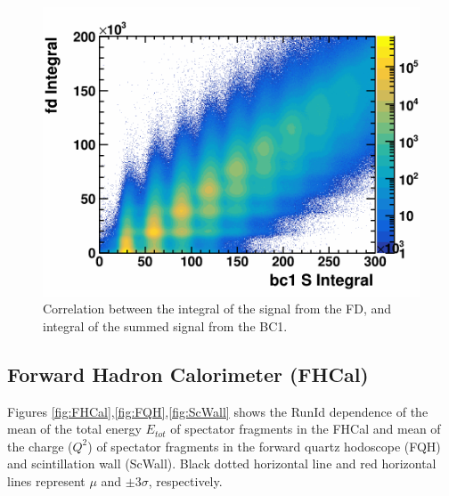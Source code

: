     \begin{figure}[H]
        \begin{center}
            \includegraphics[width=0.49\linewidth]{QA_RunByRun_24.04_new/H2_NoRuns/cut5_h2_bc1sInt_fdInt.png}
            \vspace{-3mm}
            \caption{Correlation between the integral of the signal from the FD, and integral of the summed signal from the BC1.}
            \label{fig:bc1_vs_fd}
        \end{center}
        \vspace{-5mm}
    \end{figure}




\subsection{ Forward Hadron Calorimeter (FHCal)}

    
    Figures \ref{fig:FHCal},\ref{fig:FQH},\ref{fig:ScWall} shows the RunId dependence of the mean of the total energy 
    $E_{tot}$ of spectator fragments in the FHCal and mean of the charge ($Q^{2}$) 
    of spectator fragments in the forward quartz hodoscope (FQH) and scintillation wall (ScWall). Black dotted horizontal line and
    red horizontal lines represent $\mu$ and $\pm3\sigma$, respectively.

